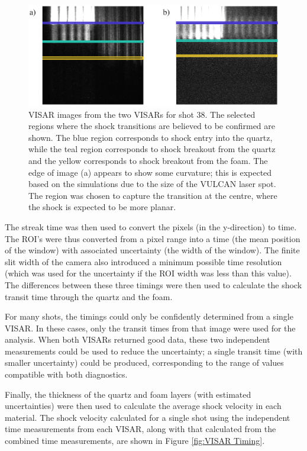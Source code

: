 \begin{figure} [h]
\begin{centering}
\includegraphics[width=1.0\textwidth]{figures/Experiment/VISARROI.eps}%
\caption{\label{fig:VISAR ROI} VISAR images from the two VISARs for shot 38. The selected regions where the shock transitions are believed to be confirmed are shown. The blue region corresponds to shock entry into the quartz, while the teal region corresponds to shock breakout from the quartz and the yellow corresponds to shock breakout from the foam. The edge of image (a) appears to show some curvature; this is expected based on the simulations due to the size of the VULCAN laser spot. The region was chosen to capture the transition at the centre, where the shock is expected to be more planar.}
\end{centering}
\end{figure}

The streak time was then used to convert the pixels (in the y-direction) to time. The ROI's were thus converted from a pixel range into a time (the mean position of the window) with associated uncertainty (the width of the window). The finite slit width of the camera also introduced a minimum possible time resolution (which was used for the uncertainty if the ROI width was less than this value). The differences between these three timings were then used to calculate the shock transit time through the quartz and the foam.

For many shots, the timings could only be confidently determined from a single VISAR. In these cases, only the transit times from that image were used for the analysis. When both VISARs returned good data, these two independent measurements could be used to reduce the uncertainty; a single transit time (with smaller uncertainty) could be produced, corresponding to the range of values compatible with both diagnostics. 

Finally, the thickness of the quartz and foam layers (with estimated uncertainties) were then used to calculate the average shock velocity in each material. The shock velocity calculated for a single shot using the independent time measurements from each VISAR, along with that calculated from the combined time measurements, are shown in Figure \ref{fig:VISAR Timing}.

